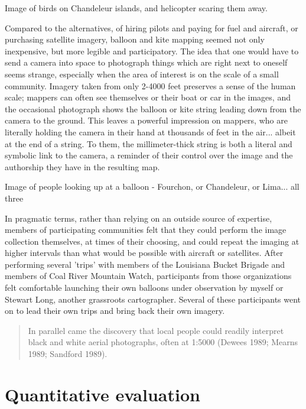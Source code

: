\documentclass[11pt]{report}
\begin{document}
Image of birds on Chandeleur islands, and helicopter scaring them away.  

Compared to the alternatives, of hiring pilots and paying for fuel and aircraft, or purchasing satellite imagery, balloon and kite mapping seemed not only inexpensive, but more legible and participatory. The idea that one would have to send a camera into space to photograph things which are right next to oneself seems strange, especially when the area of interest is on the scale of a small community. Imagery taken from only 2-4000 feet preserves a sense of the human scale; mappers can often see themselves or their boat or car in the images, and the occasional photograph shows the balloon or kite string leading down from the camera to the ground. This leaves a powerful impression on mappers, who are literally holding the camera in their hand at thousands of feet in the air... albeit at the end of a string. To them, the millimeter-thick string is both a literal and symbolic link to the camera, a reminder of their control over the image and the authorship they have in the resulting map.  

Image of people looking up at a balloon - Fourchon, or Chandeleur, or Lima... all three

In pragmatic terms, rather than relying on an outside source of expertise, members of participating communities felt that they could perform the image collection themselves, at times of their choosing, and could repeat the imaging at higher intervals than what would be possible with aircraft or satellites. After performing several 'trips' with members of the Louisiana Bucket Brigade and members of Coal River Mountain Watch, participants from those organizations felt comfortable launching their own balloons under observation by myself or Stewart Long, another grassroots cartographer. Several of these participants went on to lead their own trips and bring back their own imagery.

\begin{quote}
In parallel came the discovery that local people could readily interpret black and white aerial photographs, often at 1:5000 (Dewees 1989; Mearns 1989; Sandford 1989). 
\cite{chambers2006participatory}
\end{quote}


\section{Quantitative evaluation}

\end{document}
